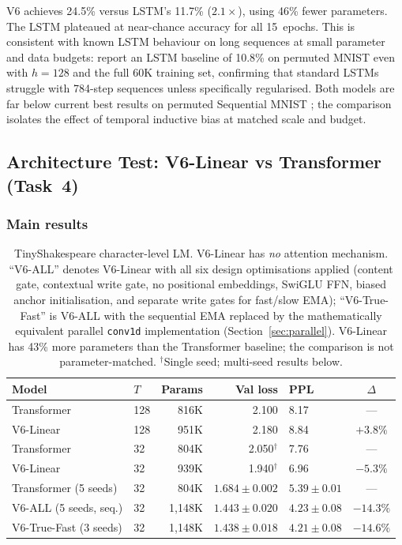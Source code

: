 \documentclass[11pt,a4paper]{article}
\begin{document}
V6 achieves 24.5\% versus LSTM's 11.7\% ($2.1\times$), using 46\% fewer
parameters. The LSTM plateaued at near-chance accuracy for all 15~epochs.
This is consistent with known LSTM behaviour on long sequences at small
parameter and data budgets: \citet{arjovsky2016unitary} report an LSTM
baseline of 10.8\% on permuted MNIST even with $h=128$ and the full 60K
training set, confirming that standard LSTMs struggle with 784-step
sequences unless specifically regularised.
Both models are far below current best results on permuted Sequential MNIST
\citep{arjovsky2016unitary}; the comparison isolates the effect of temporal
inductive bias at matched scale and budget.

\subsection{Architecture Test: V6-Linear vs Transformer (Task~4)}
\label{sec:arch_results}

\subsubsection{Main results}

\begin{table}[t]
\centering
\caption{%
TinyShakespeare character-level LM. V6-Linear has \emph{no} attention
mechanism. ``V6-ALL'' denotes V6-Linear with all six design optimisations
applied (content gate, contextual write gate, no positional embeddings,
SwiGLU FFN, biased anchor initialisation, and separate write gates for
fast/slow EMA);
``V6-True-Fast'' is V6-ALL
with the sequential EMA replaced by the mathematically equivalent parallel
\texttt{conv1d} implementation (Section~\ref{sec:parallel}).
V6-Linear has 43\% more parameters than the Transformer baseline;
the comparison is not parameter-matched.
$^\dagger$Single seed; multi-seed results below.%
}
\label{tab:arch}
\begin{tabular}{@{}llrrlc@{}}
\toprule
Model & $T$ & Params & Val loss & PPL & $\Delta$ \\
\midrule
Transformer         & 128 & 816K  & 2.100           & 8.17  & --- \\
V6-Linear           & 128 & 951K  & 2.180           & 8.84  & $+3.8\%$ \\
\midrule
Transformer         & 32  & 804K  & 2.050$^\dagger$ & 7.76  & --- \\
V6-Linear           & 32  & 939K  & 1.940$^\dagger$ & 6.96  & $-5.3\%$ \\
\midrule
Transformer (5 seeds)    & 32 & 804K  & $1.684\pm0.002$ & $5.39\pm0.01$ & --- \\
V6-ALL (5 seeds, seq.)   & 32 & 1,148K & $1.443\pm0.020$ & $4.23\pm0.08$ & $-14.3\%$ \\
V6-True-Fast (3 seeds)   & 32 & 1,148K & $1.438\pm0.018$ & $4.21\pm0.08$ & $-14.6\%$ \\
\bottomrule
\end{tabular}
\end{table}
\end{document}
